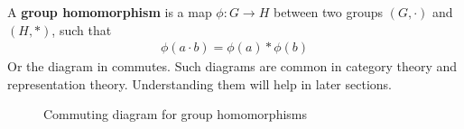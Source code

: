 A \textbf{group homomorphism} is a map $\phi: G \to H$ between two groups $(G, \cdot)$ and $(H, *)$, such that
\begin{align}
    \phi(a \cdot b) = \phi(a) * \phi(b)
\end{align}
Or the diagram in  commutes.
Such diagrams are common in category theory and representation theory.
Understanding them will help in later sections.
\begin{figure}[h]
    \centering
    \caption{Commuting diagram for group homomorphisms}
    \label{fig:fundamentals.groups.hom-cd}
\end{figure}

